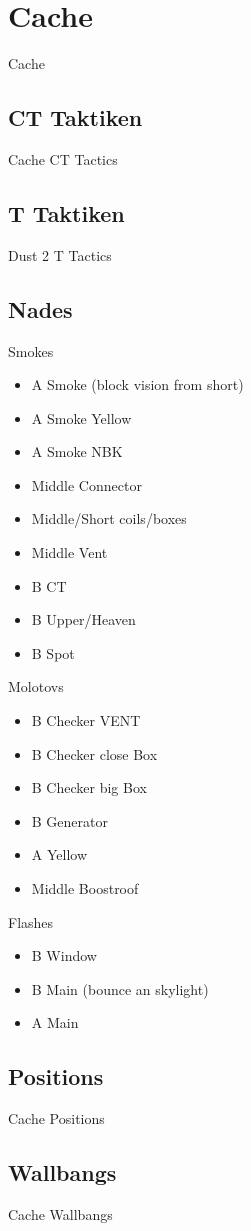 \newpage




\chapter{Cache}
\label{chap:cache}
Cache

\section{CT Taktiken}
\label{sect:cache_ct}
Cache CT Tactics

\section{T Taktiken}
\label{sect:cache_t}
Dust 2 T Tactics

\section{Nades}
\label{sect:cache_nades}
Smokes
\begin{itemize}
\item A Smoke (block vision from short)
\item A Smoke Yellow
\item A Smoke NBK
\item Middle Connector
\item Middle/Short coils/boxes
\item Middle Vent
\item B CT
\item B Upper/Heaven
\item B Spot
\end{itemize}

Molotovs
\begin{itemize}
\item B Checker VENT
\item B Checker close Box
\item B Checker big Box
\item B Generator
\item A Yellow
\item Middle Boostroof
\end{itemize}

Flashes
\begin{itemize}
\item B Window
\item B Main (bounce an skylight)
\item A Main
\end{itemize}

\section{Positions}
\label{sect:cache_positions}
Cache Positions

\section{Wallbangs}
\label{sect:cache_wallbangs}
Cache Wallbangs